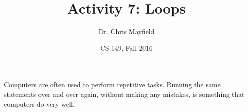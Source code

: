 \documentclass[12pt]{article}
\title{Activity 7: Loops}
\author{Dr. Chris Mayfield}
\date{CS 149, Fall 2016}
\begin{document}
\maketitle

Computers are often used to perform repetitive tasks.
Running the same statements over and over again, without making any mistakes, is something that computers do very well.




\end{document}
